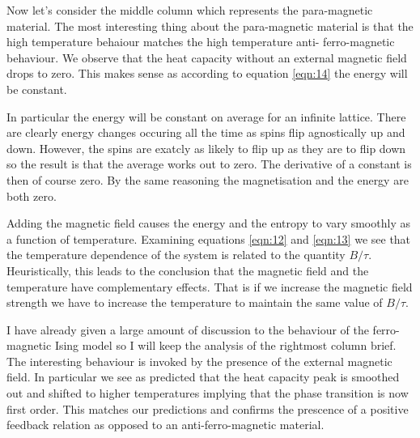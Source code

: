 \documentclass[a4paper, twocolumn]{article}
\begin{document}
Now let's consider the middle column which represents the para-magnetic %
material. The most interesting thing about the para-magnetic material %
is that the high temperature behaiour matches the high temperature anti-%
ferro-magnetic behaviour. We observe that the heat capacity without an %
external magnetic field drops to zero. This makes sense as according to %
equation \ref{eqn:14} the energy will be constant. 


In particular the energy will be constant on average for an infinite %
lattice. There are clearly energy changes occuring all the time as %
spins flip agnostically up and down. However, the spins are exatcly %
as likely to flip up as they are to flip down so the result is that %
the average works out to zero. The derivative of a constant is then %
of course zero. By the same reasoning the magnetisation and the energy %
are both zero. 


Adding the magnetic field causes the energy and the entropy to vary %
smoothly as a function of temperature. Examining equations \ref{eqn:12} %
and \ref{eqn:13} we see that the temperature dependence of the system %
is related to the quantity \(B / \tau\). Heuristically, this leads to %
the conclusion that the magnetic field and the temperature have %
complementary effects. That is if we increase the magnetic field strength %
we have to increase the temperature to maintain the same value of %
\(B / \tau\). 


I have already given a large amount of discussion to the behaviour of %
the ferro-magnetic Ising model so I will keep the analysis of the %
rightmost column brief. The interesting behaviour is invoked by the %
presence of the external magnetic field. In particular we see as predicted %
that the heat capacity peak is smoothed out and shifted to higher %
temperatures implying that the phase transition is now first order. %
This matches our predictions and confirms the prescence of a positive %
feedback relation as opposed to an anti-ferro-magnetic material. 
\end{document}

